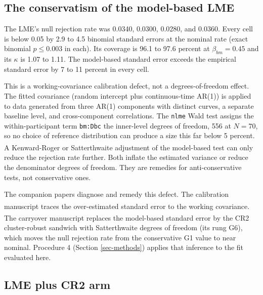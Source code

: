 \documentclass[
  11pt,
]{article}
\begin{document}
\subsection{The conservatism of the model-based LME}\label{the-conservatism-of-the-model-based-lme}

The LME's null rejection rate was 0.0340, 0.0300, 0.0280, and 0.0360. Every cell
is below 0.05 by 2.9 to 4.5 binomial
standard errors at the nominal rate (exact binomial
\(p \le 0.003\) in each). Its coverage is
96.1 to 97.6 percent at
\(\beta_{bm} = 0.45\) and its \(\kappa\) is
1.07 to 1.11. The
model-based standard error exceeds the empirical standard error by
7 to 11
percent in every cell.

This is a working-covariance calibration defect, not a
degrees-of-freedom effect. The fitted covariance (random intercept
plus continuous-time AR(1)) is applied to data generated from three
AR(1) components with distinct curves, a separate baseline level,
and cross-component correlations. The \texttt{nlme} Wald test assigns the
within-participant term \texttt{bm:Dbc} the inner-level degrees of
freedom, 556 at \(N = 70\), so no choice of reference distribution
can produce a size this far below 5 percent. A Kenward-Roger\textsuperscript{} or Satterthwaite adjustment of the model-based
test can only reduce the rejection rate further. Both inflate the
estimated variance or reduce the denominator degrees of freedom.
They are remedies for anti-conservative tests, not conservative
ones.

The companion papers diagnose and remedy this defect. The
calibration manuscript\textsuperscript{} traces the
over-estimated standard error to the working covariance. The
carryover manuscript\textsuperscript{} replaces the model-based
standard error by the CR2 cluster-robust sandwich with Satterthwaite
degrees of freedom (its rung G6), which moves the null rejection
rate from the conservative G1 value to near nominal. Procedure 4
(Section \ref{sec-methods}) applies that inference to the fit
evaluated here.

\subsection{LME plus CR2 arm}\label{sec-cr2}
\end{document}
